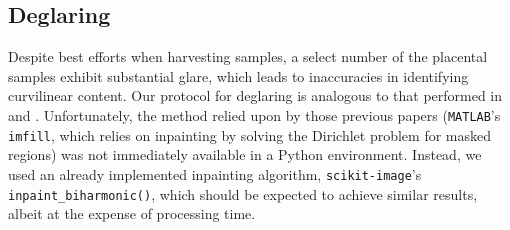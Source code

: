     
%    

    \subsection{Deglaring}
    
    Despite best efforts when harvesting samples, a select number of the placental samples exhibit substantial glare, which leads to inaccuracies in identifying curvilinear content. Our protocol for deglaring is analogous to that performed in \cite{almoussa-ucla-reu} and \cite{huynh2013filter}. Unfortunately, the method relied upon by those previous papers (\texttt{MATLAB}'s \texttt{imfill}, which relies on inpainting by solving the Dirichlet problem for masked regions) was not immediately available in a Python environment. Instead, we used an already implemented inpainting algorithm, \texttt{scikit-image}'s \texttt{inpaint\_biharmonic()}, which should be expected to achieve similar results, albeit at the expense of processing time.
    
